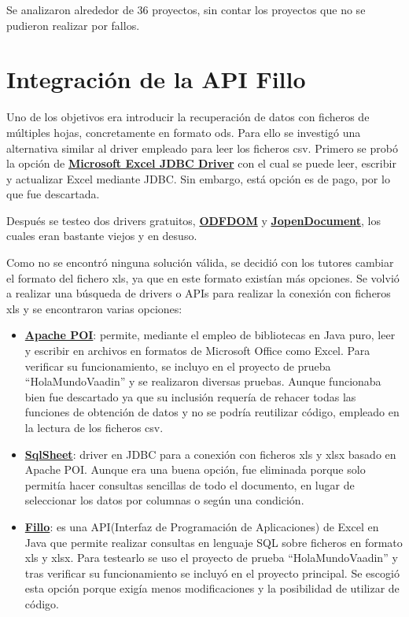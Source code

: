 Se analizaron alrededor de 36 proyectos, sin contar los proyectos que no se pudieron realizar por fallos.

\section{Integración de la API Fillo}
Uno de los objetivos era introducir la recuperación de datos con ficheros de múltiples hojas, concretamente en formato ods.
Para ello se investigó una alternativa similar al driver empleado para leer los ficheros csv. Primero se probó la opción de \textbf{\href{https://www.cdata.com/drivers/excel/jdbc/}{Microsoft Excel JDBC Driver}} con el cual se puede leer, escribir y actualizar Excel mediante JDBC. Sin embargo, está opción es de pago, por lo que fue descartada. 

Después se testeo dos drivers gratuitos, \textbf{\href{https://odftoolkit.org/}{ODFDOM}} y \textbf{\href{http://www.jopendocument.org/}{JopenDocument}}, los cuales eran bastante viejos y en desuso.

Como no se encontró ninguna solución válida, se decidió con los tutores cambiar el formato del fichero xls, ya que en este formato existían más opciones. Se volvió a realizar una búsqueda de drivers o APIs para realizar la conexión con ficheros xls y se encontraron varias opciones: 
\begin{itemize}
	\item \textbf{\href{https://poi.apache.org/}{Apache POI}}: permite, mediante el empleo de bibliotecas en Java puro, leer y escribir en archivos en formatos de Microsoft Office como Excel. Para verificar su funcionamiento, se incluyo en el proyecto de prueba ``HolaMundoVaadin'' y se realizaron diversas pruebas. Aunque funcionaba bien fue descartado ya que su inclusión requería de rehacer todas las funciones de obtención de datos y no se podría reutilizar código, empleado en la lectura de los ficheros csv.
	\item \textbf{\href{https://code.google.com/archive/p/sqlsheet/}{SqlSheet}}: driver en JDBC para a conexión con ficheros xls y xlsx basado en Apache POI. Aunque era una buena opción, fue eliminada porque solo permitía hacer consultas sencillas de todo el documento, en lugar de seleccionar los datos por columnas o según una condición. 
	\item \textbf{\href{https://codoid.com/fillo/}{Fillo}}: es una API(Interfaz de Programación de Aplicaciones) de Excel en Java que permite realizar consultas en lenguaje SQL sobre ficheros en formato xls y xlsx. Para testearlo se uso el proyecto de prueba ``HolaMundoVaadin'' y tras verificar su funcionamiento se incluyó en el proyecto principal. Se escogió esta opción porque exigía menos modificaciones y la posibilidad de utilizar de código.
\end{itemize}


